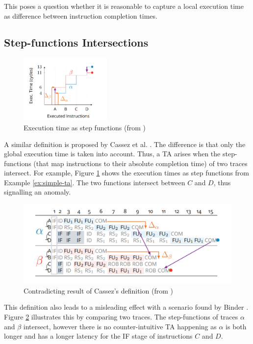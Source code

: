 This poses a question whether it is reasonable to capture a local execution time as difference between instruction completion times. 

\subsection{Step-functions Intersections}

\begin{figure}[H]
    \centering
    \includegraphics[width=0.4\textwidth]{figures/step-functions.png}
    \caption{Execution time as step functions (from \cite{binder_definitions_2022})}
    \label{fig:exec-time-step-fun}
\end{figure}

A similar definition is proposed by Cassez et al. \cite{cassez_what_2012}. The difference is that only the global execution time is taken into account. Thus, a TA arises when the step-functions (that map instructions to their absolute completion time) of two traces intersect. For example, Figure \ref{fig:exec-time-step-fun} shows the execution times as step functions from Example \ref{ex:simple-ta}. The two functions intersect between $C$ and $D$, thus signalling an anomaly.


\begin{figure}[!htb]
    \centering
    \includegraphics[width=\textwidth]{figures/step-func-2-bad.png}
    \caption{Contradicting result of Cassez's definition (from \cite{binder_definitions_2022})}
    \label{fig:step-2}
\end{figure}

This definition also leads to a misleading effect with a scenario found by Binder \cite{binder_definitions_2022}. Figure \ref{fig:step-2} illustrates this by comparing two traces. The step-functions of traces $\alpha$ and $\beta$ intersect, however there is no counter-intuitive TA happening as $\alpha$ is both longer and has a longer latency for the IF stage of instructions $C$ and $D$.

